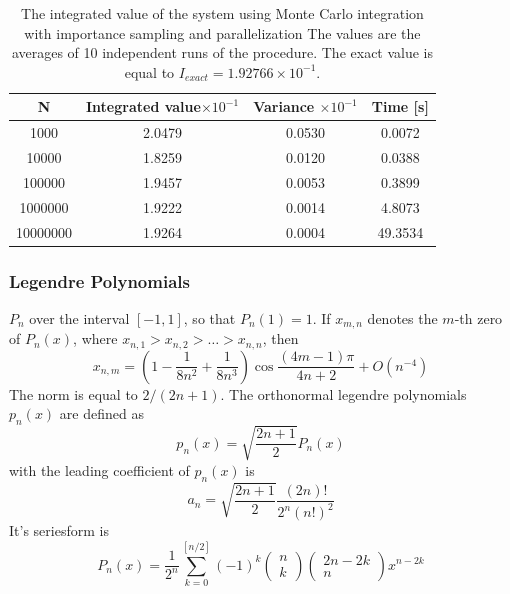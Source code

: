 \documentclass[%
reprint,
amsmath,amssymb,
aps,
]{revtex4-1}
\begin{document}
\begin{table}[!h]
	\begin{tabular}{|c|c|c|c|}
		\hline 
		\hspace{5mm} \textbf{N} \hspace{5mm} & \textbf{Integrated value}$\times 10^{-1}$ & \hspace{3mm} \textbf{Variance} $\times 10^{-1}$ & \hspace{3mm} \textbf{Time  [s]} \hspace{5mm}\\
		\hline 
			1000 & 2.0479  & 0.0530  & 0.0072 \\
			10000 & 1.8259  & 0.0120  & 0.0388 \\
			100000 & 1.9457  & 0.0053  & 0.3899 \\
			1000000 & 1.9222  & 0.0014  & 4.8073 \\
			10000000 & 1.9264  & 0.0004  & 49.3534 \\
		\hline 
	\end{tabular}
	\caption{\label{mc_values_par} \centering The integrated value of the system using Monte Carlo integration with importance sampling and parallelization The values are the averages of 10 independent runs of the procedure. The exact value is equal to $I_{exact} = 1.92766 \times 10^{-1}$.}
\end{table}



\newpage
\twocolumngrid

\subsubsection{Legendre Polynomials}
$P_n$ over the interval $[-1,1]$, so that $P_n(1) = 1$. If $x_{m,n}$ denotes the $m$-th zero of $P_n(x)$, where $x_{n,1} > x_{n,2} > \dots > x_{n,n} $, then 
\begin{equation}
x_{n, m}=\left(1-\frac{1}{8 n^{2}}+\frac{1}{8 n^{3}}\right) \cos \frac{(4 m-1) \pi}{4 n+2}+O\left(n^{-4}\right)
\end{equation}
The norm is equal to $2/(2n+1)$. The orthonormal legendre polynomials $p_n(x)$ are defined as 
\begin{equation}
p_{n}(x)=\sqrt{\frac{2 n+1}{2}} P_{n}(x)
\end{equation}
with the leading coefficient of $p_n(x)$ is 
\begin{equation}
a_{n}=\sqrt{\frac{2 n+1}{2}} \frac{(2 n) !}{2^{n}(n !)^{2}}
\end{equation}
It's seriesform is
\begin{equation}
P_{n}(x)=\frac{1}{2^{n}} \sum_{k=0}^{[n / 2]}(-1)^{k}\left(\begin{array}{l}{n} \\ {k}\end{array}\right)\left(\begin{array}{c}{2 n-2 k} \\ {n}\end{array}\right) x^{n-2 k}
\end{equation}
\end{document}
